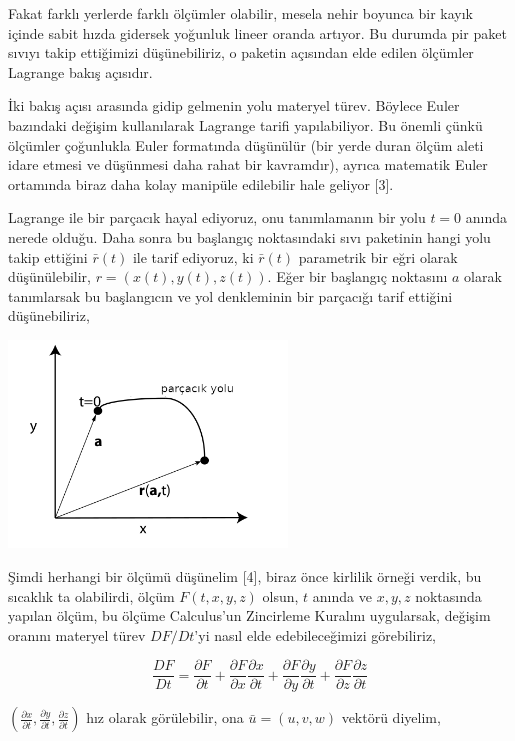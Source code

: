 \documentclass[12pt,fleqn]{article}\usepackage{../../common}
\begin{document}
Fakat farklı yerlerde farklı ölçümler olabilir, mesela nehir boyunca bir kayık
içinde sabit hızda gidersek yoğunluk lineer oranda artıyor. Bu durumda pir paket
sıvıyı takip ettiğimizi düşünebiliriz, o paketin açısından elde edilen ölçümler
Lagrange bakış açısıdır. 

İki bakış açısı arasında gidip gelmenin yolu materyel türev. Böylece Euler
bazındaki değişim kullanılarak Lagrange tarifi yapılabiliyor. Bu önemli çünkü
ölçümler çoğunlukla Euler formatında düşünülür (bir yerde duran ölçüm aleti
idare etmesi ve düşünmesi daha rahat bir kavramdır), ayrıca matematik Euler
ortamında biraz daha kolay manipüle edilebilir hale geliyor [3].

Lagrange ile bir parçacık hayal ediyoruz, onu tanımlamanın bir yolu $t=0$ anında
nerede olduğu. Daha sonra bu başlangıç noktasındaki sıvı paketinin hangi yolu
takip ettiğini $\bar{r}(t)$ ile tarif ediyoruz, ki $\bar{r}(t)$ parametrik bir
eğri olarak düşünülebilir, $r = ( x(t), y(t), z(t) )$. Eğer bir başlangıç
noktasını $a$ olarak tanımlarsak bu başlangıcın ve yol denkleminin bir parçacığı
tarif ettiğini düşünebiliriz,

\includegraphics[width=20em]{phy_050_cons_02.png}

Şimdi herhangi bir ölçümü düşünelim [4], biraz önce kirlilik örneği verdik, bu
sıcaklık ta olabilirdi, ölçüm $F(t,x,y,z)$ olsun, $t$ anında ve $x,y,z$
noktasında yapılan ölçüm, bu ölçüme Calculus'un Zincirleme Kuralını uygularsak,
değişim oranını materyel türev $D F / Dt$'yi nasıl elde edebileceğimizi
görebiliriz,

$$
\frac{D F}{D t} =
\frac{\partial F}{\partial t} +
\frac{\partial F}{\partial x} \frac{\partial x}{\partial t} + 
\frac{\partial F}{\partial y} \frac{\partial y}{\partial t} + 
\frac{\partial F}{\partial z} \frac{\partial z}{\partial t} 
$$

$(\frac{\partial x}{\partial t}, \frac{\partial y}{\partial t},\frac{\partial
z}{\partial t})$ hız olarak görülebilir, ona $\bar{u} = (u,v,w)$ vektörü diyelim,
\end{document}
